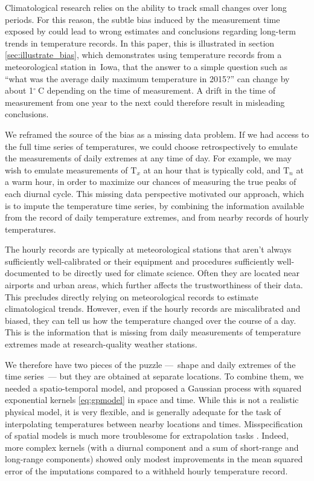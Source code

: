 \documentclass[letter]{article}
\newcommand{\T}{\mathrm{T}}
\newcommand{\Tn}{\T_{n}}
\newcommand{\Tx}{\T_{x}}
\newcommand{\degreeC}{{}^{\circ}~\mathrm{C}}
\renewcommand{\cite}[1]{\citep{#1}}
\begin{document}
        Climatological research relies on the ability to track small changes over long periods.
For this reason, the subtle bias induced by the measurement time
exposed by \cite{baker1975effect}
could lead to wrong estimates and conclusions regarding long-term trends in temperature records.
In this paper, this is illustrated in section \ref{sec:illustrate_bias},
which demonstrates using temperature records from a meteorological station in~Iowa, that the answer to a simple question such as ``what was the average daily maximum temperature in 2015?'' can change by about 1\(\degreeC\) depending on the time of measurement.
A drift in the time of measurement from one year to the next could therefore result in misleading conclusions.
    


        We reframed the source of the bias as a missing data problem.
If we had access to the full time series of temperatures, we could choose retrospectively to emulate the measurements of daily extremes at any time of day.
For example, we may wish to emulate measurements of \(\Tx\) at an hour that is typically cold, and \(\Tn\) at a warm hour, in order to maximize our chances of measuring the true peaks of each diurnal cycle.
This missing data perspective motivated our approach, which is to impute the temperature time series, by combining the information available from the record of daily temperature extremes,
and from nearby records of hourly temperatures.

The hourly records are typically at meteorological stations
that aren't always sufficiently well-calibrated
or their equipment and procedures sufficiently well-documented
to be directly used for climate science.
Often they are located near airports and urban areas,
which further affects the trustworthiness of their data.
This precludes directly relying on meteorological records to estimate climatological trends.
However, even if the hourly records are miscalibrated and biased,
they can tell us how the temperature changed over the course of a day.
This is the information that is missing from daily measurements of temperature extremes made at research-quality weather stations.
    


        We therefore have two pieces of the puzzle ---~shape and daily extremes of the time series~--- but they are obtained at separate locations.
To combine them, we needed a spatio-temporal model, and proposed a Gaussian process with squared exponential kernels \eqref{eq:gpmodel} in space and time.
While this is not a realistic physical model, it is very flexible, and is generally adequate for the task of interpolating temperatures between nearby locations and times.
Misspecification of spatial models is much more troublesome for extrapolation tasks \cite{stein2012interpolation}.
Indeed, more complex kernels (with a diurnal component and a sum of short-range and long-range components) showed only modest improvements in the mean squared error of the imputations compared to a withheld hourly temperature record.
\end{document}
